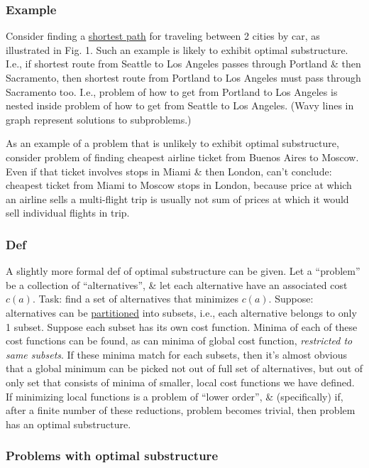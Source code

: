 \documentclass{article}
\begin{document}
\subsubsection{Example}
Consider finding a \href{https://en.wikipedia.org/wiki/Shortest_path_problem}{shortest path} for traveling between 2 cities by car, as illustrated in Fig. 1. Such an example is likely to exhibit optimal substructure. I.e., if shortest route from Seattle to Los Angeles passes through Portland \& then Sacramento, then shortest route from Portland to Los Angeles must pass through Sacramento too. I.e., problem of how to get from Portland to Los Angeles is nested inside problem of how to get from Seattle to Los Angeles. (Wavy lines in graph represent solutions to subproblems.)

As an example of a problem that is unlikely to exhibit optimal substructure, consider problem of finding cheapest airline ticket from Buenos Aires to Moscow. Even if that ticket involves stops in Miami \& then London, can't conclude: cheapest ticket from Miami to Moscow stops in London, because price at which an airline sells a multi-flight trip is usually not sum of prices at which it would sell individual flights in trip.

\subsubsection{Def}
A slightly more formal def of optimal substructure can be given. Let a ``problem'' be a collection of ``alternatives'', \& let each alternative have an associated cost $c(a)$. Task: find a set of alternatives that minimizes $c(a)$. Suppose: alternatives can be \href{https://en.wikipedia.org/wiki/Partition_of_a_set}{partitioned} into subsets, i.e., each alternative belongs to only 1 subset. Suppose each subset has its own cost function. Minima of each of these cost functions can be found, as can minima of global cost function, {\it restricted to same subsets}. If these minima match for each subsets, then it's almost obvious that a global minimum can be picked  not out of full set of alternatives, but out of only set that consists of minima of smaller, local cost functions we have defined. If minimizing local functions is a problem of ``lower order'', \& (specifically) if, after a finite number of these reductions, problem becomes trivial, then problem has an optimal substructure.

\subsubsection{Problems with optimal substructure}
\end{document}
